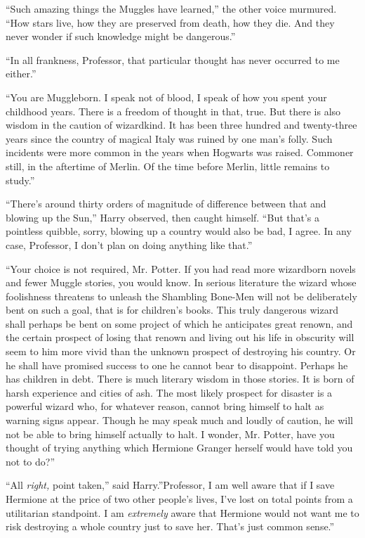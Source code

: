 ``Such amazing things the Muggles have learned,'' the other voice
murmured. ``How stars live, how they are preserved from death, how they
die. And they never wonder if such knowledge might be dangerous.''

``In all frankness, Professor, that particular thought has never
occurred to me either.''

``You are Muggleborn. I speak not of blood, I speak of how you spent
your childhood years. There is a freedom of thought in that, true. But
there is also wisdom in the caution of wizardkind. It has been three
hundred and twenty-three years since the country of magical Italy was
ruined by one man's folly. Such incidents were more common in the years
when Hogwarts was raised. Commoner still, in the aftertime of Merlin. Of
the time before Merlin, little remains to study.''

``There's around thirty orders of magnitude of difference between that
and blowing up the Sun,'' Harry observed, then caught himself. ``But
that's a pointless quibble, sorry, blowing up a country would also be
bad, I agree. In any case, Professor, I don't plan on doing anything
like that.''

``Your choice is not required, Mr. Potter. If you had read more
wizardborn novels and fewer Muggle stories, you would know. In serious
literature the wizard whose foolishness threatens to unleash the
Shambling Bone-Men will not be deliberately bent on such a goal, that is
for children's books. This truly dangerous wizard shall perhaps be bent
on some project of which he anticipates great renown, and the certain
prospect of losing that renown and living out his life in obscurity will
seem to him more vivid than the unknown prospect of destroying his
country. Or he shall have promised success to one he cannot bear to
disappoint. Perhaps he has children in debt. There is much literary
wisdom in those stories. It is born of harsh experience and cities of
ash. The most likely prospect for disaster is a powerful wizard who, for
whatever reason, cannot bring himself to halt as warning signs appear.
Though he may speak much and loudly of caution, he will not be able to
bring himself actually to halt. I wonder, Mr. Potter, have you thought
of trying anything which Hermione Granger herself would have told you
not to do?''

``All \emph{right,} point taken,'' said Harry.''Professor, I am well
aware that if I save Hermione at the price of two other people's lives,
I've lost on total points from a utilitarian standpoint. I am
\emph{extremely} aware that Hermione would not want me to risk
destroying a whole country just to save her. That's just common sense.''

